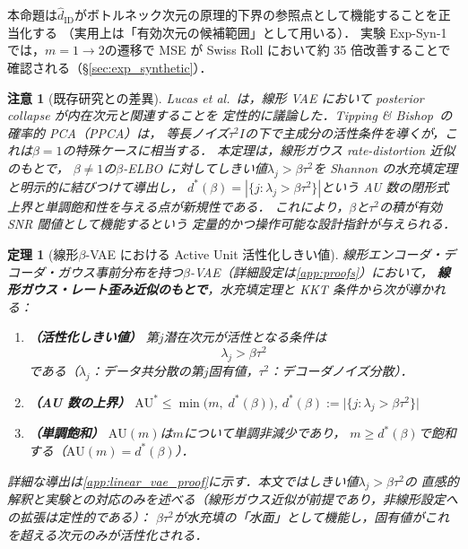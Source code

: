\documentclass[11pt,a4paper]{jsarticle}
\newtheorem{theorem}{定理}
\newtheorem{remark}{注意}
\begin{document}
本命題は$\hat{d}_\mathrm{ID}$がボトルネック次元の原理的下界の参照点として機能することを正当化する
（実用上は「有効次元の候補範囲」として用いる）．
実験 Exp-Syn-1 では，$m = 1 \to 2$の遷移で MSE が Swiss Roll において約 35 倍改善することで確認される（§\ref{sec:exp_synthetic}）．

\begin{remark}[既存研究との差異]
Lucas et al.~\cite{lucas2019elbo}は，線形 VAE において posterior collapse が内在次元と関連することを
定性的に議論した．Tipping \& Bishop~\cite{tippingbishop1999ppca}の確率的 PCA（PPCA）は，
等長ノイズ$\tau^2 I$の下で主成分の活性条件を導くが，これは$\beta = 1$の特殊ケースに相当する．
本定理は，線形ガウス rate-distortion 近似のもとで，
$\beta \neq 1$の$\beta$-ELBO に対してしきい値$\lambda_j > \beta\tau^2$を
Shannon の水充填定理\cite{cover2006elements}と明示的に結びつけて導出し，
$d^*(\beta) = |\{j:\lambda_j > \beta\tau^2\}|$という AU 数の閉形式上界と単調飽和性を与える点が新規性である．
これにより，$\beta$と$\tau^2$の積が有効 SNR 閾値として機能するという
定量的かつ操作可能な設計指針が与えられる．
\end{remark}

\begin{theorem}[線形$\beta$-VAE における Active Unit 活性化しきい値]\label{thm:linear_vae}
線形エンコーダ・デコーダ・ガウス事前分布を持つ$\beta$-VAE（詳細設定は\ref{app:proofs}）において，
\textbf{線形ガウス・レート歪み近似のもとで}，水充填定理と KKT 条件から次が導かれる：

\begin{enumerate}
  \item \textbf{（活性化しきい値）} 第$j$潜在次元が活性となる条件は
        \begin{equation}
          \lambda_j > \beta \tau^2 \label{eq:au_threshold}
        \end{equation}
        である（$\lambda_j$：データ共分散の第$j$固有値，$\tau^2$：デコーダノイズ分散）．
  \item \textbf{（AU 数の上界）}
        $\mathrm{AU}^* \leq \min\bigl(m,\; d^*(\beta)\bigr)$,\quad
        $d^*(\beta) := \bigl|\{j : \lambda_j > \beta\tau^2\}\bigr|$
  \item \textbf{（単調飽和）}
        $\mathrm{AU}(m)$は$m$について単調非減少であり，
        $m \geq d^*(\beta)$で飽和する（$\mathrm{AU}(m) = d^*(\beta)$）．
\end{enumerate}

\noindent
詳細な導出は\ref{app:linear_vae_proof}に示す．本文ではしきい値$\lambda_j > \beta\tau^2$の
直感的解釈と実験との対応のみを述べる（線形ガウス近似が前提であり，非線形設定への拡張は定性的である）：
$\beta\tau^2$が水充填の「水面」として機能し，固有値がこれを超える次元のみが活性化される．
\end{theorem}
\end{document}
